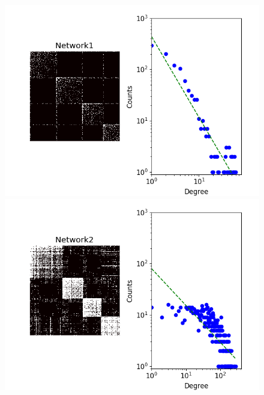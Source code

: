 \begin{figure}[h]
        \begin{minipage}{0.24\textwidth}
            \includegraphics[width=\textwidth]{img/corpus/network1_dd}
        \end{minipage}
        \begin{minipage}{0.24\textwidth}
            \includegraphics[width=\textwidth]{img/corpus/network2_dd}
        \end{minipage}
        \begin{minipage}{0.24\textwidth}

\end{minipage}
\end{figure}
